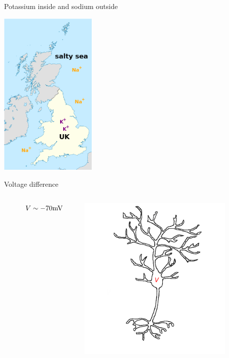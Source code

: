 \documentclass{beamer}
\newcommand{\crish}{\color{reddish}}
\newcommand{\cbla}{\color{black}}
\newcommand{\cred}{\color{red}}
\begin{document}
\begin{frame}{Potassium inside and sodium outside}
  \begin{center}
    \includegraphics[height=8cm]{uk.png}
  \end{center}
\end{frame}


\begin{frame}{Voltage difference}
  \begin{columns}
        \begin{column}{0.2\textwidth}
      \end{column}
    \begin{column}{0.3\textwidth}
  $\cred V\crish\sim -70\mbox{mV}\cbla $
    \end{column}
    \begin{column}{0.3\textwidth}
    \includegraphics[height=8cm]{voltage.png}
    \end{column}
    \begin{column}{0.2\textwidth}
      \end{column}
    \end{columns}
\end{frame}
\end{document}
